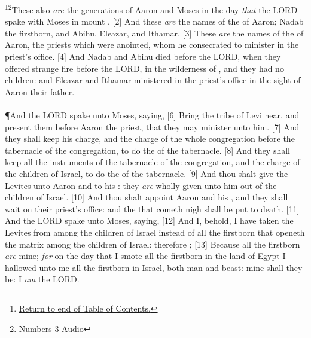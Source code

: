 \footnote{\textcolor[cmyk]{0.99998,1,0,0}{\hyperlink{TOC}{Return to end of Table of Contents.}}}\footnote{\href{https://audiobible.com/bible/numbers_3.html}{\textcolor[cmyk]{0.99998,1,0,0}{Numbers 3 Audio}}}\textcolor[cmyk]{0.99998,1,0,0}{These also \emph{are} the generations of Aaron and Moses in the day \emph{that} the LORD spake with Moses in mount .}
[2] \textcolor[cmyk]{0.99998,1,0,0}{And these \emph{are} the names of the  of Aaron; Nadab the firstborn, and Abihu, Eleazar, and Ithamar.}
[3] \textcolor[cmyk]{0.99998,1,0,0}{These \emph{are} the names of the  of Aaron, the priests which were anointed, whom he consecrated to minister in the priest's office.}
[4] \textcolor[cmyk]{0.99998,1,0,0}{And Nadab and Abihu died before the LORD, when they offered strange fire before the LORD, in the wilderness of , and they had no children: and Eleazar and Ithamar ministered in the priest's office in the sight of Aaron their father.}\\
\\
\P \textcolor[cmyk]{0.99998,1,0,0}{And the LORD spake unto Moses, saying,}
[6] \textcolor[cmyk]{0.99998,1,0,0}{Bring the tribe of Levi near, and present them before Aaron the priest, that they may minister unto him.}
[7] \textcolor[cmyk]{0.99998,1,0,0}{And they shall keep his charge, and the charge of the whole congregation before the tabernacle of the congregation, to do the  of the tabernacle.}
[8] \textcolor[cmyk]{0.99998,1,0,0}{And they shall keep all the instruments of the tabernacle of the congregation, and the charge of the children of Israel, to do the  of the tabernacle.}
[9] \textcolor[cmyk]{0.99998,1,0,0}{And thou shalt give the Levites unto Aaron and to his : they \emph{are} wholly given unto him out of the children of Israel.}
[10] \textcolor[cmyk]{0.99998,1,0,0}{And thou shalt appoint Aaron and his , and they shall wait on their priest's office: and the  that cometh nigh shall be put to death.}
[11] \textcolor[cmyk]{0.99998,1,0,0}{And the LORD spake unto Moses, saying,}
[12] \textcolor[cmyk]{0.99998,1,0,0}{And I, behold, I have taken the Levites from among the children of Israel instead of all the firstborn that openeth the matrix among the children of Israel: therefore ;}
[13] \textcolor[cmyk]{0.99998,1,0,0}{Because all the firstborn \emph{are} mine; \emph{for} on the day that I smote all the firstborn in the land of Egypt I hallowed unto me all the firstborn in Israel, both man and beast: mine shall they be: I \emph{am} the LORD.}\\

